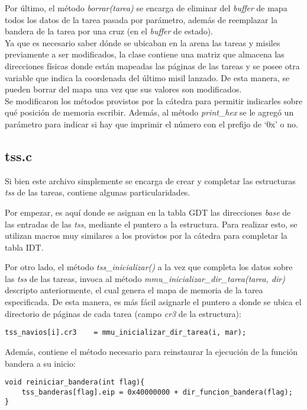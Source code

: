 \documentclass[a4paper]{article}
\newenvironment{codesnippet}{%
	\begin{Sbox}\begin{minipage}{\textwidth}\sffamily\small}%
	{\end{minipage}\end{Sbox}%
		\begin{center}%
		\vspace{-0.4cm}\colorbox{litegrey}{\TheSbox}\end{center}\vspace{0.3cm}}
\begin{document}
Por último, el método \textit{borrar(tarea)} se encarga de eliminar del \textit{buffer} de mapa todos los datos de la tarea pasada por parámetro, además de reemplazar la bandera de la tarea por una cruz (en el \textit{buffer} de estado).
\\

Ya que es necesario saber dónde se ubicaban en la arena las tareas y misiles previamente a ser modificados, la clase contiene una matriz que almacena las direcciones físicas donde están mapeadas las páginas de las tareas y se posee otra variable que indica la coordenada del último misil lanzado. De esta manera, se pueden borrar del mapa una vez que sus valores son modificados.
\\

Se modificaron los métodos provistos por la cátedra para permitir indicarles sobre qué posición de memoria escribir. Además, al método \textit{print_hex} se le agregó un parámetro para indicar si hay que imprimir el número con el prefijo de `0x' o no.

\subsection{tss.c}
Si bien este archivo simplemente se encarga de crear y completar las estructuras \textit{tss} de las tareas, contiene algunas particularidades.


Por empezar, es aquí donde se asignan en la tabla GDT las direcciones \textit{base} de las entradas de las \textit{tss}, mediante el puntero a la estructura. Para realizar esto, se utilizan macros muy similares a los provistos por la cátedra para completar la tabla IDT.


Por otro lado, el método \textit{tss_inicializar()} a la vez que completa los datos sobre las \textit{tss} de las tareas, invoca al método \textit{mmu_inicializar_dir_tarea(tarea, dir)} descripto anteriormente, el cual genera el mapa de memoria de la tarea especificada. De esta manera, es más fácil asignarle el puntero a donde se ubica el directorio de páginas de cada tarea (campo \textit{cr3} de la estructura):
\begin{codesnippet}
\begin{verbatim}
tss_navios[i].cr3    = mmu_inicializar_dir_tarea(i, mar);
\end{verbatim}
\end{codesnippet}

Además, contiene el método necesario para reinstaurar la ejecución de la función bandera a su inicio:
\begin{codesnippet}
\begin{verbatim}
void reiniciar_bandera(int flag){
    tss_banderas[flag].eip = 0x40000000 + dir_funcion_bandera(flag);
}
\end{verbatim}
\end{codesnippet}
\end{document}
